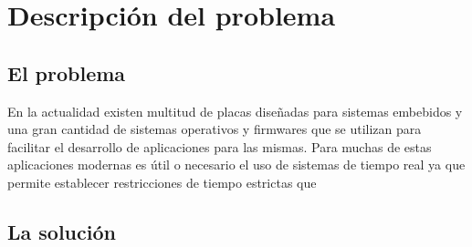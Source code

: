 \chapter{Descripción del problema}
\section{El problema}
En la actualidad existen multitud de placas diseñadas para sistemas embebidos y una gran cantidad de sistemas operativos y firmwares que se utilizan para facilitar el desarrollo de aplicaciones para las mismas.
Para muchas de estas aplicaciones modernas es útil o necesario el uso de sistemas de tiempo real ya que permite establecer restricciones de tiempo estrictas que

%

\section{La solución}

